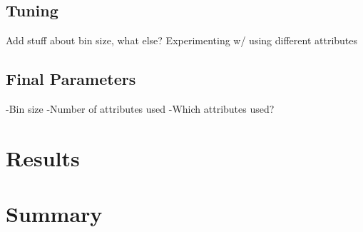 \documentclass[twoside,11pt]{article}
\begin{document}
\subsection{Tuning}

Add stuff about bin size, what else? \newline
Experimenting w/ using different attributes

\subsection{Final Parameters}

-Bin size \newline
-Number of attributes used \newline
-Which attributes used? \newline

\section{Results}

\section{Summary}


\end{document}
